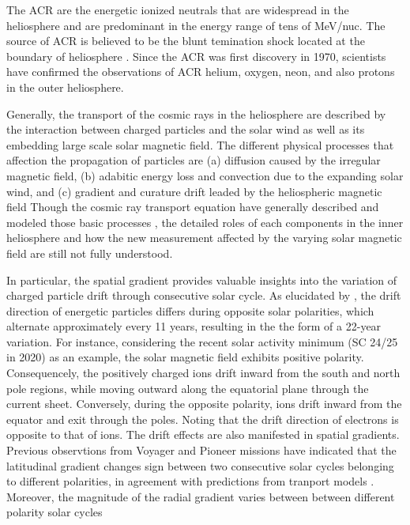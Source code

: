The \ac{ACR} are the energetic ionized neutrals that are widespread in the heliosphere and are predominant in the energy range of tens of MeV/nuc. The source of \ac{ACR} is believed to be the blunt temination shock located at the boundary of heliosphere \citep{McComas2006GeoRL}. Since the \ac{ACR} was first discovery in 1970, scientists have confirmed the observations of \ac{ACR} helium, oxygen, neon, and also protons in the outer heliosphere. \citep{Garcia1973ICRC,Hoverstadt1973PhRvL,McDonald1974ApJ,Potgieter2013LRSP}

Generally, the transport of the cosmic rays in the heliosphere are described by the interaction between charged particles and the solar wind as well as its embedding large scale solar magnetic field. The different physical processes that affection the propagation of particles are (a) diffusion caused by the irregular magnetic field, (b) adabitic energy loss and convection due to the expanding solar wind, and (c) gradient and curature drift leaded by the heliospheric magnetic field
Though the cosmic ray transport equation have generally described and modeled those basic processes \citep{Parker1965Pss,Jokipii1977ApJ,Jokipii1981ApJ,McDonald2001ICRC}, the detailed roles of each components in the inner heliosphere and how the new measurement affected by the varying solar magnetic field are still not fully understood. \citep{Rankin2021ApJ}

In particular, the spatial gradient provides valuable insights into the variation of charged particle drift through consecutive solar cycle. As elucidated by \citet{Jokipii1977ApJ, Jokipii1979ApJ, Potgieter2013LRSP}, the drift direction of energetic particles differs during opposite solar polarities, which alternate approximately every 11 years, resulting in the the form of a 22-year variation. For instance, considering the recent solar activity minimum (\ac{SC} 24/25 in 2020) as an example, the solar magnetic field exhibits positive polarity. Consequencely, the positively charged ions drift inward from the south and north pole regions, while moving outward along the equatorial plane through the current sheet. Conversely, during the opposite polarity, ions drift inward from the equator and exit through the poles. Noting that the drift direction of electrons is opposite to that of ions. The drift effects are also manifested in spatial gradients. Previous observtions from Voyager and Pioneer missions have indicated that the latitudinal gradient changes sign between two consecutive solar cycles belonging to different polarities, in agreement with predictions from tranport models \citep{Mckibben1979ApJ, Cummings1987GeoRL, Christon1986JGR}. Moreover, the magnitude of the radial gradient varies between between different polarity solar cycles \citep{Rankin2021ApJ,Rankin2022ApJ,Giacalone2022SSRv,Webber1981JGR,Marsden1999AdSpR}

